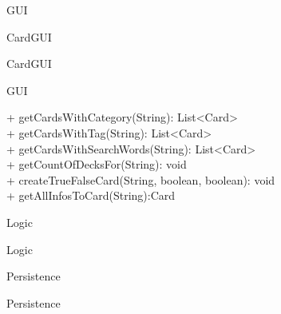 \begin{umlcomponent}{GUI}
    \begin{umlcomponent}{CardGUI}
        
        
        
        
    \end{umlcomponent}{CardGUI}
\end{umlcomponent}{GUI}
   
{ 
    + getCardsWithCategory(String): List<Card> \\ 
    + getCardsWithTag(String): List<Card> \\ 
    + getCardsWithSearchWords(String): List<Card> \\ 
    + getCountOfDecksFor(String): void\\
    + createTrueFalseCard(String, boolean, boolean): void \\
    + getAllInfosToCard(String):Card\\
}{}

\begin{umlcomponent}{Logic}
    
\end{umlcomponent}{Logic}

\begin{umlcomponent}{Persistence}
    
\end{umlcomponent}{Persistence}

